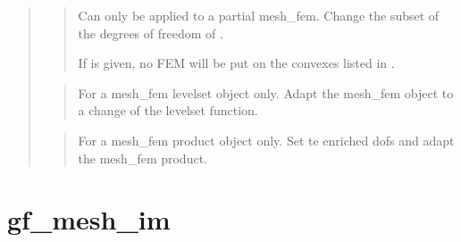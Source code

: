 \documentclass[a4paper,11pt,english]{sphinxmanual}
\begin{document}
\begin{quote}
\begin{quote}
Can only be applied to a partial mesh\_fem. Change the subset of the
degrees of freedom of .

If  is given, no FEM will be put on the convexes listed
in .
\end{quote}

\begin{quote}

For a mesh\_fem levelset object only. Adapt the mesh\_fem object to a
change of the levelset function.
\end{quote}

\begin{quote}

For a mesh\_fem product object only. Set te enriched dofs and adapt the mesh\_fem product.
\end{quote}
\end{quote}


\section{gf\_mesh\_im}
\label{\detokenize{matlab_octave/cmdref_gf_mesh_im:gf-mesh-im}}\label{\detokenize{matlab_octave/cmdref_gf_mesh_im::doc}}

\begin{sphinxVerbatim}[commandchars=\\\{\}]
    \PYG{p}{[}  \PYG{p}{]}
    \PYG{p}{[}  \PYG{p}{]}
    
        \PYG{p}{[}  \PYG{p}{[}  \PYG{p}{]}\PYG{p}{]}
    \PYG{p}{[}  \PYG{p}{]}
\end{sphinxVerbatim}
\end{document}
